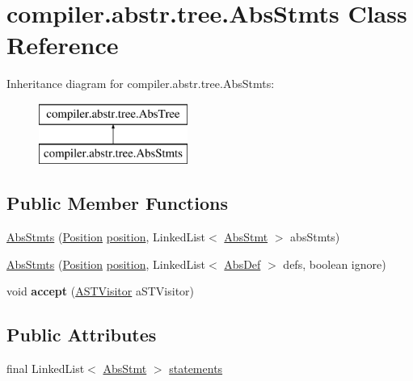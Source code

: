 \hypertarget{classcompiler_1_1abstr_1_1tree_1_1_abs_stmts}{}\section{compiler.\+abstr.\+tree.\+Abs\+Stmts Class Reference}
\label{classcompiler_1_1abstr_1_1tree_1_1_abs_stmts}
Inheritance diagram for compiler.\+abstr.\+tree.\+Abs\+Stmts\+:\begin{figure}[H]
\begin{center}
\leavevmode
\includegraphics[height=2.000000cm]{classcompiler_1_1abstr_1_1tree_1_1_abs_stmts}
\end{center}
\end{figure}
\subsection*{Public Member Functions}
\begin{DoxyCompactItemize}
\item 
\hyperlink{classcompiler_1_1abstr_1_1tree_1_1_abs_stmts_ae15c4d33cbbe4c8211323b5c07499499}{Abs\+Stmts} (\hyperlink{classcompiler_1_1_position}{Position} \hyperlink{classcompiler_1_1abstr_1_1tree_1_1_abs_tree_a127a686d3a3f9ba470f36c6b3336caea}{position}, Linked\+List$<$ \hyperlink{classcompiler_1_1abstr_1_1tree_1_1_abs_stmt}{Abs\+Stmt} $>$ abs\+Stmts)
\item 
\hyperlink{classcompiler_1_1abstr_1_1tree_1_1_abs_stmts_ad1be108e84442b930f22a7fe7e274e89}{Abs\+Stmts} (\hyperlink{classcompiler_1_1_position}{Position} \hyperlink{classcompiler_1_1abstr_1_1tree_1_1_abs_tree_a127a686d3a3f9ba470f36c6b3336caea}{position}, Linked\+List$<$ \hyperlink{classcompiler_1_1abstr_1_1tree_1_1def_1_1_abs_def}{Abs\+Def} $>$ defs, boolean ignore)
\item 
\mbox{\label{classcompiler_1_1abstr_1_1tree_1_1_abs_stmts_a8501756490b9e386904d927288c11874}} 
void {\bfseries accept} (\hyperlink{interfacecompiler_1_1abstr_1_1_a_s_t_visitor}{A\+S\+T\+Visitor} a\+S\+T\+Visitor)
\end{DoxyCompactItemize}
\subsection*{Public Attributes}
\begin{DoxyCompactItemize}
\item 
final Linked\+List$<$ \hyperlink{classcompiler_1_1abstr_1_1tree_1_1_abs_stmt}{Abs\+Stmt} $>$ \hyperlink{classcompiler_1_1abstr_1_1tree_1_1_abs_stmts_acdb710e241c750ea503cb826b0de182a}{statements}
\end{DoxyCompactItemize}



